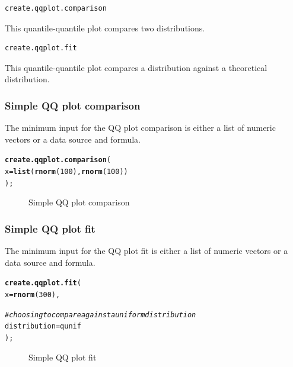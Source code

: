 \documentclass[letterpaper]{article}\usepackage[]{graphicx}\usepackage[]{color}
\makeatletter
\newcommand{\hlnum}[1]{\textcolor[rgb]{0.686,0.059,0.569}{#1}}%
\newcommand{\hlcom}[1]{\textcolor[rgb]{0.678,0.584,0.686}{\textit{#1}}}%
\newcommand{\hlstd}[1]{\textcolor[rgb]{0.345,0.345,0.345}{#1}}%
\newcommand{\hlkwc}[1]{\textcolor[rgb]{0.333,0.667,0.333}{#1}}%
\newcommand{\hlkwd}[1]{\textcolor[rgb]{0.737,0.353,0.396}{\textbf{#1}}}%
\newenvironment{kframe}{%
 \def\at@end@of@kframe{}%
 \ifinner\ifhmode%
  \def\at@end@of@kframe{\end{minipage}}%
  \begin{minipage}{\columnwidth}%
 \fi\fi%
 \def\FrameCommand##1{\hskip\@totalleftmargin \hskip-\fboxsep
 \colorbox{shadecolor}{##1}\hskip-\fboxsep
     \hskip-\linewidth \hskip-\@totalleftmargin \hskip\columnwidth}%
 \MakeFramed {\advance\hsize-\width
   \@totalleftmargin\z@ \linewidth\hsize
   \@setminipage}}%
 {\par\unskip\endMakeFramed%
 \at@end@of@kframe}
\newenvironment{knitrout}{}{} %
\makeatother
\begin{document}
\begin{verbatim}
create.qqplot.comparison
\end{verbatim}
This quantile-quantile plot compares two distributions.
\begin{verbatim}
create.qqplot.fit
\end{verbatim}
This quantile-quantile plot compares a distribution against a theoretical distribution.

\subsubsection{Simple QQ plot comparison}
The minimum input for the QQ plot comparison is either a list of numeric vectors or a data source and formula.
\begin{knitrout}
\color{fgcolor}\begin{kframe}
\begin{alltt}
\hlkwd{create.qqplot.comparison}\hlstd{(}
    \hlkwc{x} \hlstd{=} \hlkwd{list}\hlstd{(}\hlkwd{rnorm}\hlstd{(}\hlnum{100}\hlstd{),} \hlkwd{rnorm}\hlstd{(}\hlnum{100}\hlstd{))}
    \hlstd{);}
\end{alltt}
\end{kframe}\begin{figure}[]


{\centering {} 

}

\caption[Simple QQ plot comparison]{Simple QQ plot comparison\label{fig:qqcomparison}}
\end{figure}


\end{knitrout}

\subsubsection{Simple QQ plot fit}
The minimum input for the QQ plot fit is either a list of numeric vectors or a data source and formula.

\begin{knitrout}
\color{fgcolor}\begin{kframe}
\begin{alltt}
\hlkwd{create.qqplot.fit}\hlstd{(}
    \hlkwc{x} \hlstd{=} \hlkwd{rnorm}\hlstd{(}\hlnum{300}\hlstd{),}

    \hlcom{# choosing to compare against a uniform distribution}
    \hlkwc{distribution} \hlstd{= qunif}
    \hlstd{);}
\end{alltt}
\end{kframe}\begin{figure}[]


{\centering {} 

}

\caption[Simple QQ plot fit]{Simple QQ plot fit\label{fig:qqfit}}
\end{figure}


\end{knitrout}
\end{document}
